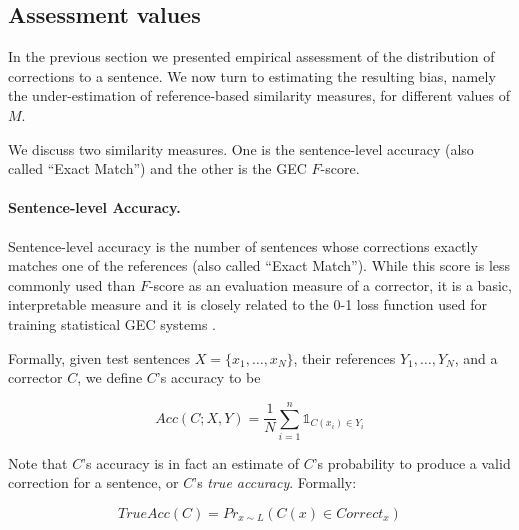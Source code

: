 \documentclass[letter,11pt]{article}
\newcommand{\lc}[1]{\footnote{\color{green}LC: #1}}
\begin{document}
		\subsection{Assessment values} \label{subsec:Assessment-values}
		
		In the previous section we presented empirical assessment of the distribution of
		corrections to a sentence. We now turn to estimating the resulting bias, namely
                the under-estimation of reference-based similarity measures, for different values of $M$.
		
		We discuss two similarity measures. One is the sentence-level accuracy
                (also called ``Exact Match'') and the other is the GEC $F$-score.
		
		\paragraph{Sentence-level Accuracy.}
		Sentence-level accuracy is the number of sentences whose corrections
                exactly matches one of the references (also called ``Exact Match'').
                While this score is less
                commonly used than $F$-score as an evaluation
		measure of a corrector, it is a basic, interpretable measure and it is
                closely related to the 0-1 loss function used for
		training statistical GEC systems
                \cite{chodorow2012problems,rozovskaya2013joint}. 
		
		Formally, given test sentences $X=\{x_1,\ldots,x_N\}$,
		their references $Y_1,\ldots,Y_N$, and a corrector $C$,
                we define $C$'s accuracy to be

		\begin{equation*}
		Acc(C;X,Y) = \frac{1}{N} \sum_{i=1}^n \mathds{1}_{C(x_i) \in Y_i}
		\end{equation*}

                Note that $C$'s accuracy is in fact an estimate of $C$'s probability to produce
                a valid correction for a sentence, or $C$'s {\it true accuracy}. Formally:

                \begin{equation*}
		  TrueAcc(C) = Pr_{x\sim{L}}\left(C\left(x\right)\in Correct_x\right)
		\end{equation*}
                
\end{document}
